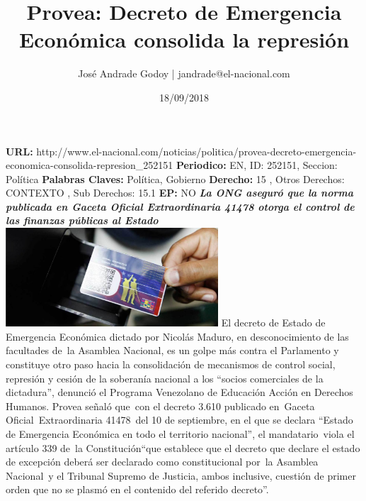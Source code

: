 \documentclass{article}%
\title{\textbf{Provea: Decreto de Emergencia Económica consolida la represión}}%
\author{José Andrade Godoy | jandrade@el{-}nacional.com}%
\date{18/09/2018}%
\begin{document}
%
\normalsize%
\maketitle%
\textbf{URL: }%
http://www.el{-}nacional.com/noticias/politica/provea{-}decreto{-}emergencia{-}economica{-}consolida{-}represion\_252151\newline%
%
\textbf{Periodico: }%
EN, %
ID: %
252151, %
Seccion: %
Política\newline%
%
\textbf{Palabras Claves: }%
Política, Gobierno\newline%
%
\textbf{Derecho: }%
15%
, Otros Derechos: %
CONTEXTO%
, Sub Derechos: %
15.1%
\newline%
%
\textbf{EP: }%
NO\newline%
\newline%
%
\textbf{\textit{La ONG aseguró que la norma publicada en Gaceta Oficial Extraordinaria 41478 otorga el control de las finanzas públicas al Estado}}%
\newline%
\newline%
%
\includegraphics[width=300px]{249.jpg}%
\newline%
%
El decreto de Estado de Emergencia Económica dictado por Nicolás Maduro, en desconocimiento de las facultades de~la Asamblea Nacional, es un golpe más contra el Parlamento y constituye otro paso hacia la consolidación de mecanismos de control social, represión y cesión de la soberanía nacional a los “socios comerciales de la dictadura”, denunció el Programa Venezolano de Educación Acción en Derechos Humanos.%
\newline%
%
Provea señaló que~con el decreto 3.610 publicado en~Gaceta Oficial~Extraordinaria 41478~del 10 de septiembre, en el que se declara “Estado de Emergencia Económica en todo el territorio nacional”, el mandatario~viola el artículo 339 de~la Constitución“que establece que el decreto que declare el estado de excepción deberá ser declarado como constitucional por~la Asamblea Nacional~y el Tribunal Supremo de Justicia, ambos inclusive, cuestión de primer orden que no se plasmó en el contenido del referido decreto”.%
\newline%
\end{document}
